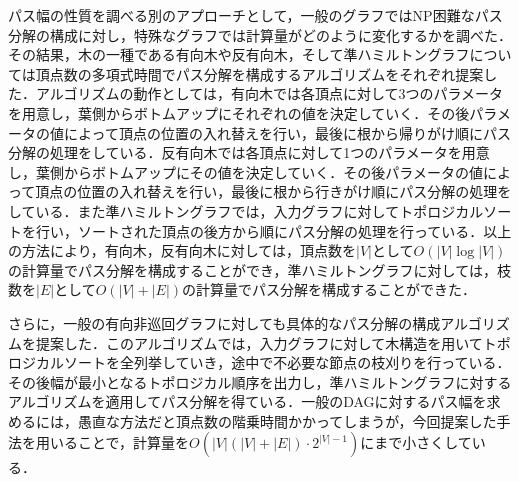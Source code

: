 \documentclass{kuisthesis}           %
\begin{document}
\begin{jabstract}
パス幅の性質を調べる別のアプローチとして，一般のグラフではNP困難なパス分解の構成に対し，特殊なグラフでは計算量がどのように変化するかを調べた．その結果，木の一種である有向木や反有向木，そして準ハミルトングラフについては頂点数の多項式時間でパス分解を構成するアルゴリズムをそれぞれ提案した．アルゴリズムの動作としては，有向木では各頂点に対して3つのパラメータを用意し，葉側からボトムアップにそれぞれの値を決定していく．その後パラメータの値によって頂点の位置の入れ替えを行い，最後に根から帰りがけ順にパス分解の処理をしている．反有向木では各頂点に対して1つのパラメータを用意し，葉側からボトムアップにその値を決定していく．その後パラメータの値によって頂点の位置の入れ替えを行い，最後に根から行きがけ順にパス分解の処理をしている．また準ハミルトングラフでは，入力グラフに対してトポロジカルソートを行い，ソートされた頂点の後方から順にパス分解の処理を行っている．以上の方法により，有向木，反有向木に対しては，頂点数を$|V|$として$O(|V|\log |V|)$の計算量でパス分解を構成することができ，準ハミルトングラフに対しては，枝数を$|E|$として$O(|V|+|E|)$の計算量でパス分解を構成することができた．

さらに，一般の有向非巡回グラフに対しても具体的なパス分解の構成アルゴリズムを提案した．このアルゴリズムでは，入力グラフに対して木構造を用いてトポロジカルソートを全列挙していき，途中で不必要な節点の枝刈りを行っている．その後幅が最小となるトポロジカル順序を出力し，準ハミルトングラフに対するアルゴリズムを適用してパス分解を得ている．一般のDAGに対するパス幅を求めるには，愚直な方法だと頂点数の階乗時間かかってしまうが，今回提案した手法を用いることで，計算量を$O(|V|(|V|+|E|)\cdot2^{|V|-1})$にまで小さくしている．

\end{jabstract}
\end{document}
